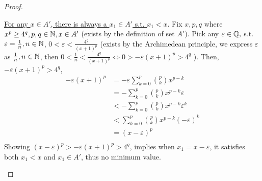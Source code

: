 \documentclass{homework}
\newcommand{\Q}{\bb{Q}} %
\newcommand{\N}{\bb{N}} %
\newcommand{\?}{\stackrel{?}{=}}
\newcommand{\ep}{\varepsilon}
\theoremstyle{definition}
\begin{document}
\begin{proof}
\begin{enumerate}
    \underline{For any $x\in A'$, there is always a $x_1\in A'$ s.t. $x_1<x$}. Fix $x,p,q$ where $x^p\geq 4^q, p,q\in\N,x\in A'$ (exists by the definition of set $A'$). Pick any $\ep\in\Q, $ s.t. $\ep=\frac1n,n\in\N$, $0<\ep<\frac{4^q}{(x+1)^p}$ (exists by the Archimedean principle, we express $\ep$ as $\frac{1}{n},n\in\N$, then $0<\frac{1}{n}<\frac{4^q}{(x+1)^p}\iff 0>-\ep(x+1)^p>4^q$ ). Then, $-\ep(x+1)^p>4^q$, \begin{align*}
            -\ep(x+1)^p&=-\ep\sum_{k=0}^{p}\binom{p}{k}x^{p-k}\\
&=-\sum_{k=0}^{p}\binom{p}{k}x^{p-k}\ep\\
&<-\sum_{k=0}^{p}\binom{p}{k}x^{p-k}\ep^k\\
&<\sum_{k=0}^{p}\binom{p}{k}x^{p-k}(-\ep)^k\\
&=(x-\ep)^p\\
        \end{align*}
Showing $(x-\ep)^p>-\ep(x+1)^p>4^q$, implies when $x_1=x-\ep$, it satisfies both $x_1<x$ and $x_1\in A'$, thus no minimum value.


    \end{enumerate}
\end{proof}


\newpage
\end{document}
